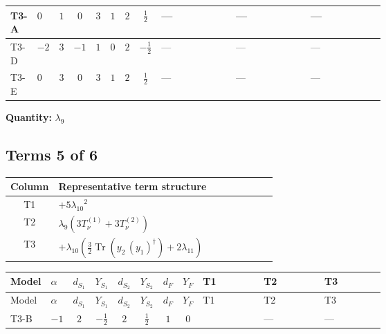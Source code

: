 \documentclass[8pt]{article}
\begin{document}
\begin{landscape}
\begin{longtable}{@{}llcccccc >{\raggedright\arraybackslash}p{0.21\linewidth} >{\raggedright\arraybackslash}p{0.21\linewidth} >{\raggedright\arraybackslash}p{0.21\linewidth}@{}}
\midrule
T3-A & $0$ & $1$ & $0$ & $3$ & $1$ & $2$ & $\frac{1}{2}$ & --- & --- & --- \\
\midrule
T3-D & $-2$ & $3$ & $-1$ & $1$ & $0$ & $2$ & $-\frac{1}{2}$ & --- & --- & --- \\
\midrule
T3-E & $0$ & $3$ & $0$ & $3$ & $1$ & $2$ & $\frac{1}{2}$ & --- & --- & --- \\
\midrule
\bottomrule
\end{longtable}
\clearpage
\noindent\textbf{Quantity: }$\lambda_{9}$\par\smallskip
\subsection*{Terms 5 of 6}
\begin{center}
\begin{tabular}{@{}c >{\raggedright\arraybackslash}p{0.82\linewidth}@{}}
\toprule
Column & Representative term structure \\
\midrule
T1 & \(\displaystyle +5 {\lambda_{10}}^2\) \\
\midrule
T2 & \(\displaystyle {\lambda_9} (3 T_{\nu}^{(1)}+3 T_{\nu}^{(2)})\) \\
\midrule
T3 & \(\displaystyle +{\lambda_{10}} \left(\frac{3}{2} \operatorname{Tr}\!\left({y_2}\,\left({y_1}\right)^{\dagger}\right)+2 {\lambda_{11}}\right)\) \\
\midrule
\bottomrule
\end{tabular}
\end{center}
\smallskip
\tiny
\begin{longtable}{@{}llcccccc >{\raggedright\arraybackslash}p{0.21\linewidth} >{\raggedright\arraybackslash}p{0.21\linewidth} >{\raggedright\arraybackslash}p{0.21\linewidth}@{}}
\toprule
Model & $\alpha$ & $d_{S_1}$ & $Y_{S_1}$ & $d_{S_2}$ & $Y_{S_2}$ & $d_F$ & $Y_F$ & T1 & T2 & T3 \\
\midrule
\endfirsthead
\toprule
Model & $\alpha$ & $d_{S_1}$ & $Y_{S_1}$ & $d_{S_2}$ & $Y_{S_2}$ & $d_F$ & $Y_F$ & T1 & T2 & T3 \\
\midrule
\endhead
T3-B & $-1$ & $2$ & $-\frac{1}{2}$ & $2$ & $\frac{1}{2}$ & $1$ & $0$ & \scriptsize\adjustbox{max width=\linewidth}{$\begin{gathered} +5 {\lambda_{10}}^2 \\ +5 {\lambda_{11}}^2\end{gathered}$} & --- & --- \\
\midrule

\end{longtable}
\end{landscape}
\end{document}
